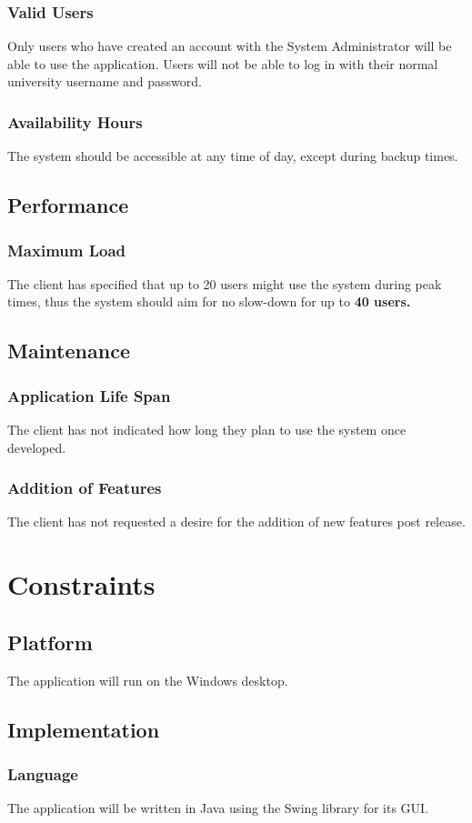 \documentclass{article}
\begin{document}
\subsubsection{Valid Users}
Only users who have created an account with the System Administrator will be able
to use the application. Users will not be able to log in with their normal
university username and password.
\subsubsection{Availability Hours}
The system should be accessible at any time of day, except during backup times.
\subsection{Performance}
\subsubsection{Maximum Load}
The client has specified that up to 20 users might use the system during
peak times, thus the system should aim for no slow-down for up to \textbf{40 users.}
\subsection{Maintenance}
\subsubsection{Application Life Span}
The client has not indicated how long they plan to use the system once developed.
\subsubsection{Addition of Features}
The client has not requested a desire for the addition of new
features post release.

\section{Constraints}
\subsection{Platform}
The application will run on the Windows desktop.
\subsection{Implementation}
\subsubsection{Language}
The application will be written in Java using the Swing library for its GUI.
\end{document}
